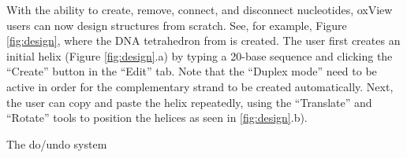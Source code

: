 With the ability to create, remove, connect, and disconnect nucleotides, oxView users can now design structures from scratch. See, for example, Figure \ref{fig:design}, where the DNA tetrahedron from \cite{goodman2005rapid} is created. The user first creates an initial helix (Figure \ref{fig:design}.a) by typing a 20-base sequence and clicking the ``Create'' button in the ``Edit'' tab. Note that the ``Duplex mode'' need to be active in order for the complementary strand to be created automatically. Next, the user can copy and paste the helix repeatedly, using the ``Translate'' and ``Rotate'' tools to position the helices as seen in \ref{fig:design}.b).

The do/undo system


\newcommand{\toolHeight}{1.5em}


